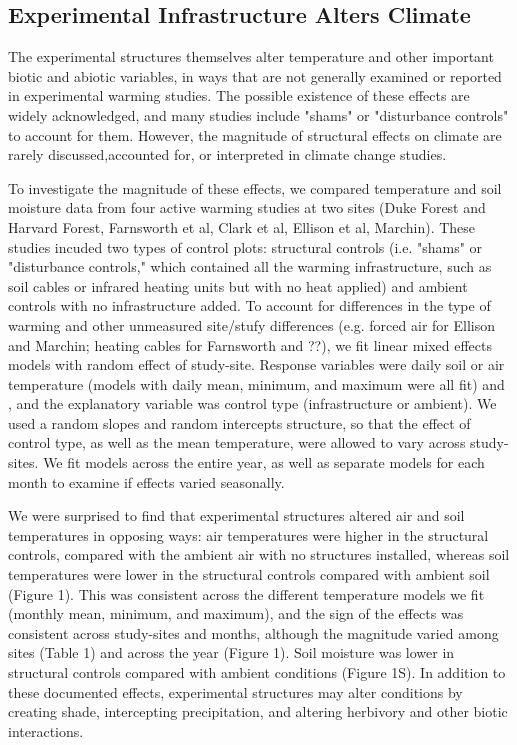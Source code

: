 \documentclass{article}
\begin{document}
\subsection {Experimental Infrastructure Alters Climate}
The experimental structures themselves alter temperature and other important biotic and abiotic variables, in ways that are not generally examined or reported in experimental warming studies. The possible existence of these effects are widely acknowledged, and many studies include "shams" or "disturbance controls" to account for them. However, the magnitude of structural effects on climate are rarely discussed,accounted for, or interpreted in climate change studies.
\par To investigate the magnitude of these effects, we compared temperature and soil moisture data from four active warming studies at two sites (Duke Forest and Harvard Forest, Farnsworth et al, Clark et al, Ellison et al, Marchin). These studies incuded two types of control plots: structural controls (i.e. "shams" or "disturbance controls," which contained all the warming infrastructure, such as soil cables or infrared heating units but with no heat applied) and ambient controls with no infrastructure added.  To account for differences in the type of warming and other unmeasured site/stufy differences (e.g. forced air for Ellison and Marchin; heating cables for Farnsworth and ??), we fit linear mixed effects models with random effect of study-site. Response variables were daily soil or air temperature (models with daily  mean, minimum, and maximum were all fit) and , and the explanatory variable was control type (infrastructure or ambient). We used a random slopes and random intercepts structure, so that the effect of control type, as well as the mean temperature, were allowed to vary across study-sites. We fit models across the entire year, as well as separate models for each month to examine if effects varied seasonally.
\par We were surprised to find that experimental structures altered air and soil temperatures in opposing ways:  air temperatures were higher in the structural controls, compared with the ambient air with no structures installed, whereas soil temperatures were lower in the structural controls compared with ambient soil (Figure 1). This was consistent across the different temperature models we fit (monthly mean, minimum, and maximum), and the sign of the effects was consistent across study-sites and months, although the magnitude varied among sites (Table 1) and across the year (Figure 1). Soil moisture was lower in structural controls compared with ambient conditions (Figure 1S). In addition to these documented effects, experimental structures may alter conditions by creating shade, intercepting precipitation, and altering herbivory and other biotic interactions.
\end{document}

